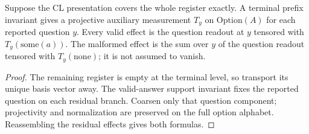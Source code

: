 \begin{lemma}
\label{lem:intro-terminal-invariant}
\leanok
Suppose the CL presentation covers the whole register exactly. A terminal
prefix invariant gives a projective auxiliary measurement $T_y$ on
$\mathrm{Option}(A)$ for each reported question $y$. Every valid effect
is the question readout at $y$ tensored with $T_y(\mathrm{some}(a))$.
The malformed effect is the sum over $y$ of the question readout tensored
with $T_y(\mathrm{none})$; it is not assumed to vanish.
\end{lemma}
\begin{proof}
\leanok
The remaining register is empty at the terminal level, so transport its
unique basis vector away. The valid-answer support invariant fixes the
reported question on each residual branch. Coarsen only that question
component; projectivity and normalization are preserved on the full
option alphabet. Reassembling the residual effects gives both formulas.
\end{proof}

